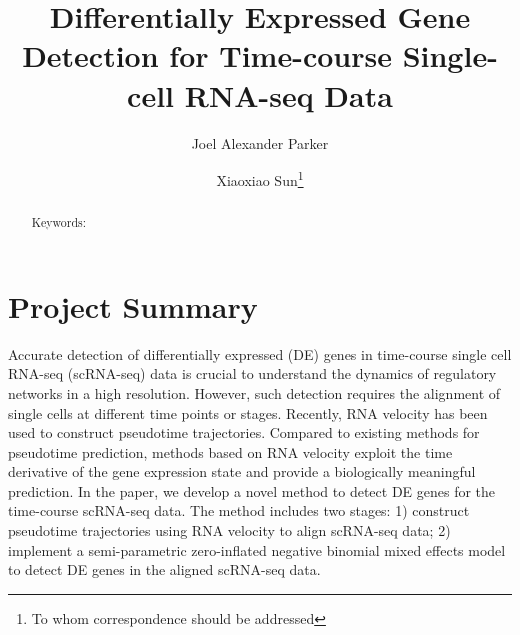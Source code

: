\documentclass[12pt]{article}
\title{\bf Differentially Expressed Gene Detection for Time-course Single-cell RNA-seq Data}
\author[1]{Joel Alexander Parker}
\author[1]{Xiaoxiao Sun\footnote{To whom correspondence should be addressed}}
\affil[1]{Department of Epidemiology and Biostatistics, University of Arizona}
\date{}
\begin{document}
\maketitle

\begin{abstract}

Keywords: 
\end{abstract}

\section*{Project Summary}
Accurate detection of differentially expressed (DE) genes in time-course single cell RNA-seq (scRNA-seq) data is crucial to understand the dynamics of regulatory networks in a high resolution. However, such detection requires the alignment of single cells at different time points or stages. Recently, RNA velocity has been used to construct pseudotime trajectories. Compared to existing methods for pseudotime prediction, methods based on RNA velocity exploit the time derivative of the gene expression state and provide a biologically meaningful prediction. In the paper, we develop a novel method to detect DE genes for the time-course scRNA-seq data. The method includes two stages: 1) construct pseudotime trajectories using RNA velocity to align scRNA-seq data; 2) implement a semi-parametric zero-inflated negative binomial mixed effects model to detect DE genes in the aligned scRNA-seq data. 




\end{document}

